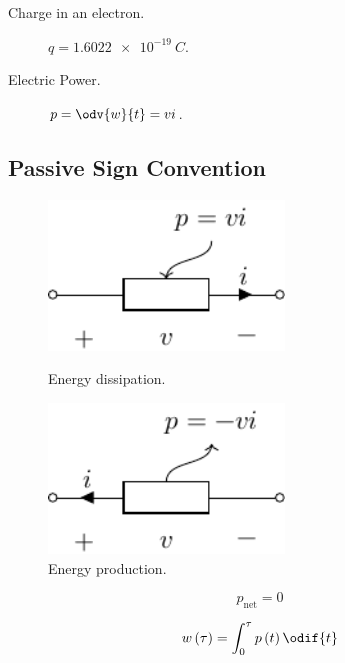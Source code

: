 \documentclass{article}
\begin{document}
\endgroup
\begin{description}
    \item[Charge in an electron.] \(q = \qty{1.6022e-19}{C}\).
    \item[Electric Power.] \(\displaystyle p = \odv{w}{t} = vi\).
\end{description}
\subsection{Passive Sign Convention}
\begin{figure}[H]
    \centering
    \begin{minipage}[H]{0.48\textwidth}
        \centering
        \includegraphics[height = 4cm, keepaspectratio = true]{figures/passive_component.pdf}
        \caption{Energy dissipation.}
    \end{minipage}
    \hfill
    \begin{minipage}[H]{0.48\textwidth}
        \centering
        \includegraphics[height = 4cm, keepaspectratio = true]{figures/active_component.pdf}
        \caption{Energy production.}
    \end{minipage}
\end{figure}
\begin{theorem}
    \begin{equation*}
        p_{\mathrm{net}} = 0
    \end{equation*}
\end{theorem}
\begin{theorem}[Energy]
    \begin{equation*}
        w\left( \tau \right) = \int_0^\tau p\left( t \right) \odif{t}
    \end{equation*}
\end{theorem}
\end{document}
